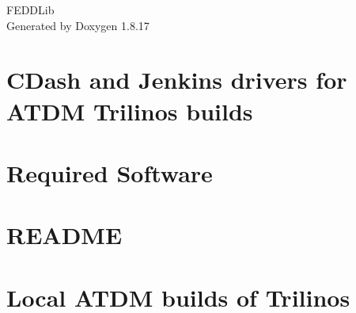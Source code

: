 \let\mypdfximage\pdfximage\def\pdfximage{\immediate\mypdfximage}\documentclass[twoside]{book}
\newcommand{\+}{\discretionary{\mbox{\scriptsize$\hookleftarrow$}}{}{}}
\newcommand{\clearemptydoublepage}{%
  \newpage{\pagestyle{empty}\cleardoublepage}%
}
\begin{document}
\hypersetup{pageanchor=false,
             bookmarksnumbered=true,
             pdfencoding=unicode
            }
\begin{titlepage}
\vspace*{7cm}
\begin{center}%
{\Large F\+E\+D\+D\+Lib }\\
\vspace*{1cm}
{\large Generated by Doxygen 1.8.17}\\
\end{center}
\end{titlepage}
\clearemptydoublepage
{}
\tableofcontents
\clearemptydoublepage
{}
\hypersetup{pageanchor=true}

\chapter{C\+Dash and Jenkins drivers for A\+T\+DM Trilinos builds}
\label{md__home_user_Programme_opt_FEDDLib_FEEDLIB_LEA_source_FEDDLib_cmake_ctest_drivers_atdm_README}

\chapter{Required Software}
\label{md__home_user_Programme_opt_FEDDLib_FEEDLIB_LEA_source_FEDDLib_cmake_ctest_drivers_windows_README}

\chapter{R\+E\+A\+D\+ME}
\label{md__home_user_Programme_opt_FEDDLib_FEEDLIB_LEA_source_FEDDLib_cmake_README_8ProjectCiFileChangeLogic}

\chapter{Local A\+T\+DM builds of Trilinos}
\label{md__home_user_Programme_opt_FEDDLib_FEEDLIB_LEA_source_FEDDLib_cmake_std_atdm_README}

\end{document}
